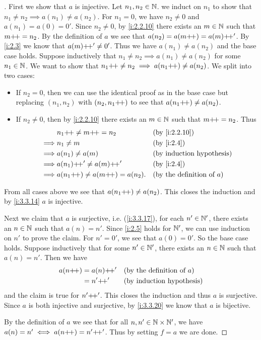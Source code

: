 \begin{proof}[]
  First we show that \(a\) is injective.
  Let \(n_1, n_2 \in \mathbb{N}\).
  we induct on \(n_1\) to show that \(n_1 \neq n_2 \implies a(n_1) \neq a(n_2)\).
  For \(n_1 = 0\), we have \(n_2 \neq 0\) and \(a(n_1) = a(0) = 0'\).
  Since \(n_2 \neq 0\), by \cref{i:2.2.10} there exists an \(m \in \mathbb{N}\) such that \(m{+}\!{+} = n_2\).
  By the definition of \(a\) we see that \(a(n_2) = a(m{+}\!{+}) = a(m){+}\!{+}'\).
  By \cref{i:2.3} we know that \(a(m){+}\!{+}' \neq 0'\).
  Thus we have \(a(n_1) \neq a(n_2)\) and the base case holds.
  Suppose inductively that \(n_1 \neq n_2 \implies a(n_1) \neq a(n_2)\) for some \(n_1 \in \mathbb{N}\).
  We want to show that \(n_1{+}\!{+} \neq n_2 \implies a(n_1{+}\!{+}) \neq a(n_2)\).
  We split into two cases:
  \begin{itemize}
    \item If \(n_2 = 0\), then we can use the identical proof as in the base case but replacing \((n_1, n_2)\) with \((n_2, n_1{+}\!{+})\) to see that \(a(n_1{+}\!{+}) \neq a(n_2)\).
    \item If \(n_2 \neq 0\), then by \cref{i:2.2.10} there exists an \(m \in \mathbb{N}\) such that \(m{+}\!{+} = n_2\).
          Thus
          \begin{align*}
                     & n_1\pp \neq m\pp = n_2           &  & \by{i:2.2.10}                       \\
            \implies & n_1 \neq m                       &  & \by{i:2.4}                          \\
            \implies & a(n_1) \neq a(m)                 &  & \byIH                               \\
            \implies & a(n_1)\pp' \neq a(m)\pp'         &  & \by{i:2.4}                          \\
            \implies & a(n_1\pp) \neq a(m\pp) = a(n_2). &  & \text{(by the definition of \(a\))}
          \end{align*}
  \end{itemize}
  From all cases above we see that \(a(n_1{+}\!{+}) \neq a(n_2)\).
  This closes the induction and by \cref{i:3.3.14} \(a\) is injective.

  Next we claim that \(a\) is surjective, i.e. (\cref{i:3.3.17}), for each \(n' \in \mathbb{N}'\), there exists an \(n \in \mathbb{N}\) such that \(a(n) = n'\).
  Since \cref{i:2.5} holds for \(\mathbb{N}'\), we can use induction on \(n'\) to prove the claim.
  For \(n' = 0'\), we see that \(a(0) = 0'\).
  So the base case holds.
  Suppose inductively that for some \(n' \in \mathbb{N}'\), there exists an \(n \in \mathbb{N}\) such that \(a(n) = n'\).
  Then we have
  \begin{align*}
    a(n{+}\!{+}) & = a(n){+}\!{+}' &  & \text{(by the definition of \(a\))} \\
            & = n'{+}\!{+}'   &  & \text{(by induction hypothesis)}
  \end{align*}
  and the claim is true for \(n'{+}\!{+}'\).
  This closes the induction and thus \(a\) is surjective.
  Since \(a\) is both injective and surjective, by \cref{i:3.3.20} we know that \(a\) is bijective.

  By the definition of \(a\) we see that for all \(n, n' \in \mathbb{N} \times \mathbb{N}'\), we have \(a(n) = n' \iff a(n{+}\!{+}) = n'{+}\!{+}'\).
  Thus by setting \(f = a\) we are done.
\end{proof}
